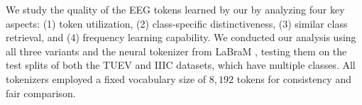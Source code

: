 




We study the quality of the EEG tokens learned by our \tokenizer by analyzing four key aspects: (1) token utilization, (2) class-specific distinctiveness, (3) similar class retrieval, and (4) frequency learning capability. We conducted our analysis using all three \tokenizer variants and the neural tokenizer from LaBraM \cite{jiang2024large}, testing them on the test splits of both the TUEV and IIIC datasets, which have multiple classes. All tokenizers employed a fixed vocabulary size of $8,192$ tokens for consistency and fair comparison.

